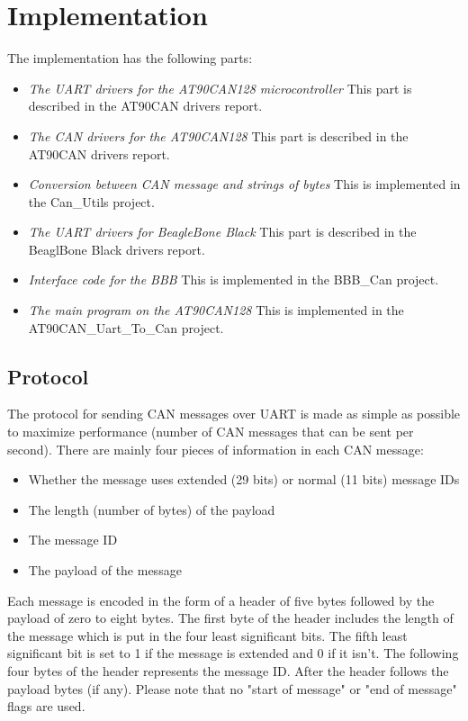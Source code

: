 
\section{Implementation}\label{sec:implementation}
The implementation has the following parts:

\begin{itemize}
   \item { \em The UART drivers for the AT90CAN128 microcontroller} \newline This part is described in the AT90CAN drivers report.
   \item { \em The CAN drivers for the AT90CAN128} \newline This part is described in the AT90CAN drivers report.
   \item { \em Conversion between CAN message and strings of bytes } \newline This is implemented in the Can\_Utils project.
   \item { \em The UART drivers for BeagleBone Black} \newline This part is described in the BeaglBone Black drivers report.
   \item { \em Interface code for the BBB} \newline This is implemented in the BBB\_Can project.
   \item { \em The main program on the AT90CAN128} \newline This is implemented in the AT90CAN\_Uart\_To\_Can project.
\end{itemize}

\subsection{Protocol}
The protocol for sending CAN messages over UART is made as simple as possible to maximize performance (number of CAN messages that can be sent per second). There are mainly four pieces of information in each CAN message: 
\begin{itemize}
   \item { Whether the message uses extended (29 bits) or normal (11 bits) message IDs} 
   \item { The length (number of bytes) of the payload} 
   \item { The message ID}
   \item { The payload of the message}
\end{itemize}

Each message is encoded in the form of a header of five bytes followed by the payload of zero to eight bytes. The first byte of the header includes the length of the message which is put in the four least significant bits. The fifth least significant bit is set to 1 if the message is extended and 0 if it isn't. 
The following four bytes of the header represents the message ID. 
After the header follows the payload bytes (if any). \newline
Please note that no "start of message" or "end of message" flags are used.

